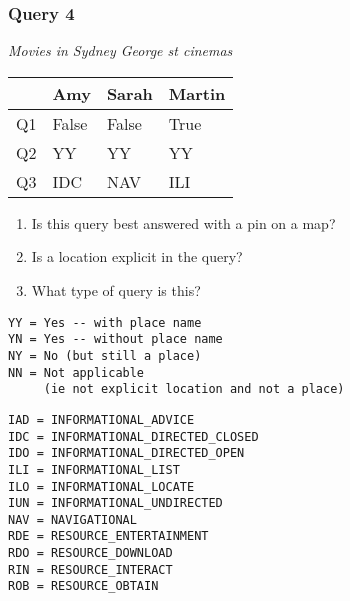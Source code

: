 \begin{frame}[fragile]
\frametitle{Query 4}
\vspace{1em}

\emph{Movies in Sydney George st cinemas}

\vfill

\begin{table}
  \centering
  \begin{tabular}{ l l l l }
    & \textbf{Amy} & \textbf{Sarah} & \textbf{Martin}\\
    \toprule
    Q1 & False & False & True\\
Q2 & YY & YY & YY\\
Q3 & IDC & NAV & ILI\\
    \bottomrule
  \end{tabular}
\end{table}

\vfill

\tiny{

\begin{enumerate}
\item Is this query best answered with a pin on a map?
\item Is a location explicit in the query?
\item What type of query is this?
\end{enumerate}

\vfill

\begin{multicols}{2}
\begin{verbatim}
YY = Yes -- with place name
YN = Yes -- without place name
NY = No (but still a place)
NN = Not applicable 
     (ie not explicit location and not a place)
\end{verbatim}

\columnbreak
\begin{verbatim}
IAD = INFORMATIONAL_ADVICE
IDC = INFORMATIONAL_DIRECTED_CLOSED
IDO = INFORMATIONAL_DIRECTED_OPEN
ILI = INFORMATIONAL_LIST
ILO = INFORMATIONAL_LOCATE
IUN = INFORMATIONAL_UNDIRECTED
NAV = NAVIGATIONAL
RDE = RESOURCE_ENTERTAINMENT
RDO = RESOURCE_DOWNLOAD
RIN = RESOURCE_INTERACT
ROB = RESOURCE_OBTAIN
\end{verbatim}
\end{multicols}
}

\end{frame}


